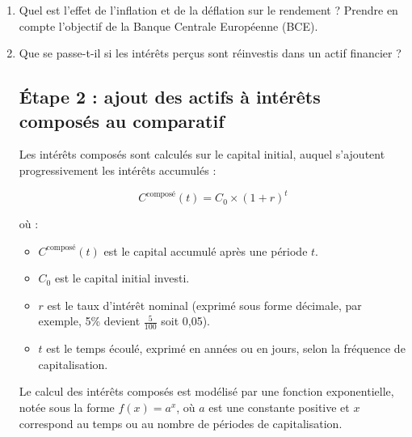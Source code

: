 \documentclass{article}
\begin{document}
\begin{enumerate}[label=\textbf{Q1.\arabic*}]
	\item Quel est l'effet de l'inflation et de la déflation sur le rendement ? Prendre en compte l'objectif de la Banque Centrale Européenne (BCE).
	      
	\item Que se passe-t-il si les intérêts perçus sont réinvestis dans un actif financier ?
	      
	      
	      \subsection*{Étape 2 : ajout des actifs à intérêts composés au comparatif}
	      \begin{tcolorbox}[
	      		colback=lightgreen, 
	      		colframe=lightgreen, 
	      		boxrule=0.5pt, 
	      		arc=0pt, 
	      		left=10pt, 
	      		right=10pt, 
	      		top=6pt, 
	      		bottom=6pt, 
	      		boxsep=2pt, 
	      		before upper={\faLightbulb\hspace{10pt}}
	      	]
	      	Les intérêts composés sont calculés sur le capital initial, auquel s'ajoutent progressivement les intérêts accumulés :
	      	    
	      	
	      	\[
	      		C^{\text{composé}}(t) = C_0 \times (1 + r)^t
	      	\]
	      	    
	      	où :
	      	\begin{itemize}
	      		\item \( C^{\text{composé}}(t) \) est le capital accumulé après une période \( t \).
	      		\item \( C_0 \) est le capital initial investi.
	      		\item \( r \) est le taux d'intérêt nominal (exprimé sous forme décimale, par exemple, 5\% devient $\frac{5}{100}$ soit 0,05).
	      		\item \( t \) est le temps écoulé, exprimé en années ou en jours, selon la fréquence de capitalisation.
	      	\end{itemize}
	      \end{tcolorbox}
	      
	      \begin{tcolorbox}[
	      		colback=lightgreen, 
	      		colframe=lightgreen, 
	      		boxrule=0.5pt, 
	      		arc=0pt, 
	      		left=10pt, 
	      		right=10pt, 
	      		top=6pt, 
	      		bottom=6pt, 
	      		boxsep=2pt, 
	      		before upper={\faLightbulb\hspace{10pt}}
	      	]
	      	Le calcul des intérêts composés est modélisé par une fonction exponentielle, notée sous la forme $f(x)=a^x$, où $a$ est une constante positive et $x$ correspond au temps ou au nombre de périodes de capitalisation.
	      	

\end{tcolorbox}
\end{enumerate}
\end{document}
